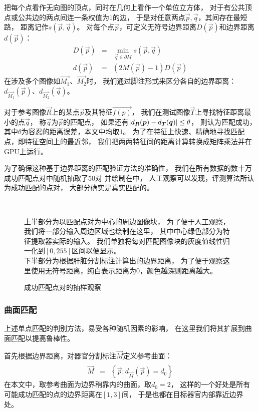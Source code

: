 把每个点看作无向图的顶点，同时在几何上看作一个单位立方体，
对于有公共顶点或公共边的两点间连一条权值为$1$的边，
于是对任意两点$\vec{p}, \vec{q}$，其间存在最短路，
距离记作$s(\vec{p}, \vec{q})$。
对每个点$\vec{p}$，可定义无符号边界距离$D(\vec{p})$和边界距离$d(\vec{p})$：
\begin{eqnarray}
    D(\vec{p}) &=& \min_{\vec{q} \in \partial M} s(\vec{p}, \vec{q})
        \nonumber \\
    d(\vec{p}) &=& (2M(\vec{p})-1)D(\vec{p})
\end{eqnarray}
在涉及多个图像如$\vec{M_1}$、$\vec{M_2}$时，
我们通过脚注形式来区分各自的边界距离：
$d_{\vec{M_1}}(\vec{p})$、$d_{\vec{M_2}}(\vec{q})$。

对于参考图像$\vec{R}$上的某点$\vec{p}$及其特征$\vec{f(p)}$，
我们在测试图像$\vec{T}$上寻找特征距离最小的点$\vec{q}$，
称$\vec{q}$为$\vec{p}$的匹配点，
如果还有$\left|d_{\boldsymbol{R}}(\boldsymbol{p}) - d_{\boldsymbol{T}}(\boldsymbol{q})\right| \le \theta$，
则认为匹配成功，其中$\theta$为容忍的距离误差，本文中均取$1$。
为了在特征上快速、精确地寻找匹配点，即特征空间上的最近邻，
我们把两两特征间的距离计算转换成矩阵乘法并在GPU上运行。

为了确保这种基于边界距离的匹配验证方法的准确性，
我们在所有数据的数十万成功匹配点对中随机抽取了50对
并绘制在中，
人工观察可以发现，评测算法所认为成功匹配的点对，
大部分确实是真实匹配的。
\begin{figure}[h!]
    {
         \\
        \vspace{0.2em}
        \caption{成功匹配点对的抽样观察}
        \label{fig:expr:pt:match}
    }
    \footnotesize
    上半部分为以匹配点对为中心的周边图像块，
    为了便于人工观察，我们将一部分输入周边区域也绘制在这里，
    其中中心绿色部分为特征提取器实际的输入。
    我们单独将每对匹配图像块的灰度值线性归一化到$[0, 255]$区间以便显示。 \\
    下半部分为根据肝脏分割标注计算出的边界距离，
    为了便于观察这里使用无符号距离，纯白表示距离为$0$，颜色越深则距离越大。
\end{figure}

\subsubsection{曲面匹配\label{sec:expr:match}}
上述单点匹配的判别方法，易受各种随机因素的影响，
在这里我们将其扩展到曲面匹配以提高鲁棒性。

首先根据边界距离，对器官分割标注$\vec{M}$定义参考曲面：
\begin{eqnarray}
    \hat{\vec{M}} &=& \left\{ \vec{p} : d_{\vec{M}}(\vec{p}) = d_0 \right\}
\end{eqnarray}
在本文中，取参考曲面为边界稍靠内的曲面，取$d_0=2$，
这样的一个好处是所有可能成功匹配的点的边界距离在$[1, 3]$间，
于是也都在目标器官内部靠近边界处。

